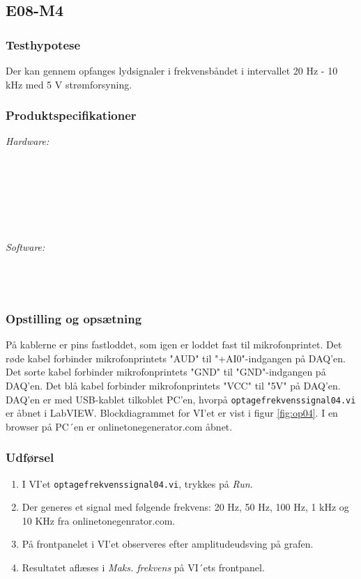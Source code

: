 \subsection{E08-M4}
\label{subsec:E08}
		\subsubsection{Testhypotese}
		Der kan gennem \elektretto{} opfanges lydsignaler i frekvensbåndet i intervallet 20 Hz - 10 kHz med 5 V strømforsyning.
		
		\subsubsection{Produktspecifikationer}
	
			\textit{Hardware:}\\
			\elektretto\\
			\pinstre\\
			\mikrofonkabel\\
			\krympeflex\\
			\daq\\
			\daqusb\\			
			\PC
	
			\textit{Software:}\\
			\labview\\
			\daqsoft\\
			\onlineg\\

	
		\subsubsection{Opstilling og opsætning}
		På kablerne er pins fastloddet, som igen er loddet fast til mikrofonprintet. Det røde kabel forbinder mikrofonprintets "AUD"{} til "+AI0"{}-indgangen på DAQ'en. Det sorte kabel forbinder mikrofonprintets "GND"{} til "GND"{}-indgangen på DAQ'en. Det blå kabel forbinder mikrofonprintets "VCC"{} til "5V"{} på DAQ'en. DAQ'en er med USB-kablet tilkoblet PC'en, hvorpå \texttt{optagefrekvenssignal04.vi} er åbnet i LabVIEW. Blockdiagrammet for VI'et er vist i figur \ref{fig:op04}. I en browser på PC´en er onlinetonegenerator.com åbnet.      
	
		\subsubsection{Udførsel}
			\begin{enumerate}
				\item I VI'et \texttt{optagefrekvenssignal04.vi}, trykkes på \textit{Run}.  
				\item Der generes et signal med følgende frekvens: 20 Hz, 50 Hz, 100 Hz, 1 kHz og 10 KHz fra onlinetonegenrator.com.
				\item På frontpanelet i VI'et observeres efter amplitudeudsving på grafen.   
				\item Resultatet aflæses i \textit{Maks. frekvens} på VI´ets frontpanel.
			\end{enumerate}
			
